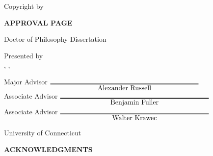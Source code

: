 \pagestyle{plain}
\setcounter{page}{2} %
\phantom{skip}
\vspace{.5in}
\begin{center}
Copyright by

\vspace{1in}
\myname

\vspace{4.5in}
\myyear
\end{center}
\newpage


\begin{center}
{\large\bf APPROVAL PAGE}

\vspace{.5in}
Doctor of Philosophy Dissertation

\vspace{.5in}
{\LARGE\bf\mythesistitle}

\vspace{.5in}
Presented by\\
\myname, \degreeoneshort, \degreetwoshort
\vspace{.75in}
\end{center}

\begin{center}
\begin{minipage}{4.5in}
Major Advisor \hfill$\underset{\hbox{\majoradvisor}}{\rule{3in}{1pt}}$\\[15pt]

Associate Advisor \hfill$\underset{\hbox{\associateone}}{\rule{3in}{1pt}}$\\[15pt]

Associate Advisor \hfill$\underset{\hbox{\associatetwo}}{\rule{3in}{1pt}}$
\end{minipage}

\vspace{1in}
University of Connecticut\\
\myyear
\end{center}


\newpage

\thispagestyle{plain}

\begin{center}
{\large\bf ACKNOWLEDGMENTS}
\vspace{1in}
\end{center}


\newpage
